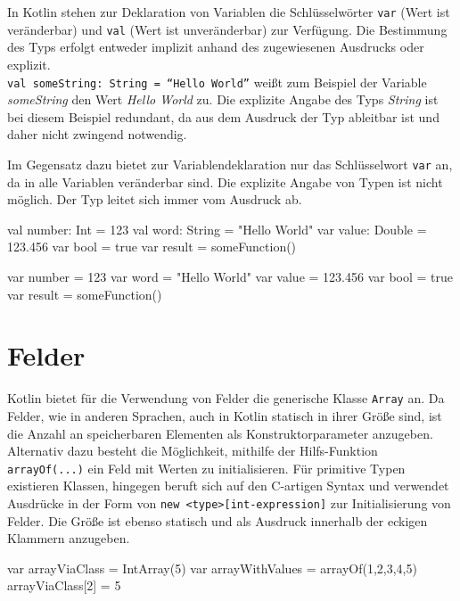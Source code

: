 In Kotlin stehen zur Deklaration von Variablen die Schlüsselwörter \texttt{var} (Wert ist veränderbar) und \texttt{val} (Wert ist unveränderbar) zur Verfügung. Die Bestimmung des Typs erfolgt entweder implizit anhand des zugewiesenen Ausdrucks oder explizit.\\ \texttt{val someString: String = ``Hello World''} weißt zum Beispiel der Variable \textit{someString} den Wert \textit{Hello World} zu. Die explizite Angabe des Typs \textit{String} ist bei diesem Beispiel redundant, da aus dem Ausdruck der Typ ableitbar ist und daher nicht zwingend notwendig.

Im Gegensatz dazu bietet \toya zur Variablendeklaration nur das Schlüsselwort \texttt{var} an, da in \toya alle Variablen veränderbar sind. Die explizite Angabe von Typen ist nicht möglich. Der Typ leitet sich immer vom Ausdruck ab.

\begin{KotlinCode}[numbers=none, caption={Variablendeklarationen in Kotlin}]
val number: Int = 123
val word: String = "Hello World"
var value: Double = 123.456
var bool = true
var result = someFunction()
\end{KotlinCode}

\begin{ToyaCode}[numbers=none, caption={Variablendeklarationen in \toya}]
var number = 123
var word = "Hello World"
var value = 123.456
var bool = true
var result = someFunction()
\end{ToyaCode}

\section{Felder}

Kotlin bietet für die Verwendung von Felder die generische Klasse \texttt{Array} an. Da Felder, wie in anderen Sprachen, auch in Kotlin statisch in ihrer Größe sind, ist die Anzahl an speicherbaren Elementen als Konstruktorparameter anzugeben. Alternativ dazu besteht die Möglichkeit, mithilfe der Hilfs-Funktion \texttt{arrayOf(...)} ein Feld mit Werten zu initialisieren. Für primitive Typen existieren Klassen, \toya hingegen beruft sich auf den C-artigen Syntax und verwendet Ausdrücke in der Form von \texttt{new <type>[int-expression]} zur Initialisierung von Felder. Die Größe ist ebenso statisch und als Ausdruck innerhalb der eckigen Klammern anzugeben.

\begin{KotlinCode}[numbers=none, caption={Felder in Kotlin}]
var arrayViaClass = IntArray(5)
var arrayWithValues = arrayOf(1,2,3,4,5)
arrayViaClass[2] = 5
\end{KotlinCode}

